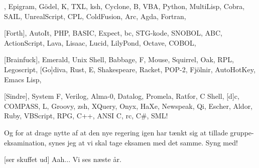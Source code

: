 \documentclass[a4paper,11pt]{article}
\begin{document}
\begin{song}
  [Kreds], Epigram, Gödel, K,
  TXL, ksh,
  Cyclone, B, VBA, Python,
  MultiLisp, Cobra, SAIL,
  UnrealScript, CPL,
  ColdFusion, Arc, Agda, Fortran,



  [Forth], AutoIt, PHP,
  BASIC, Expect, bc,
  STG-kode, SNOBOL,
  ABC, ActionScript,
  Lava, Lisaac, Lucid,
  LilyPond, Octave, COBOL,

  [Brainfuck], Emerald, Unix Shell,
  Babbage, F, Mouse, Squirrel,
  Oak, RPL, Legoscript,
  [Go]diva, Rust, E, Shakespeare,
  Racket, POP-2, Fjölnir,
  AutoHotKey, Emacs Lisp,

  [Sindre], System F, Verilog,
  Alma-0, Datalog,
  Promela, Ratfor, C Shell,
  [d]c, COMPASS, L, Groovy,
  zsh, XQuery,
  Onyx, HaXe, Newspeak, Qi,
  Escher, Aldor, Ruby,
  VBScript, RPG,
  C++, ANSI C,
  rc, C\#, SML!

\end{song}
\begin{sketch}
   Og for at drage nytte af at den nye regering igen har tænkt sig at
  tillade gruppe-eksamination, synes jeg at vi skal tage eksamen med det
  samme. Syng med!


   [ser skuffet ud] Aah... Vi ses næste år.

\end{sketch}
\end{document}
